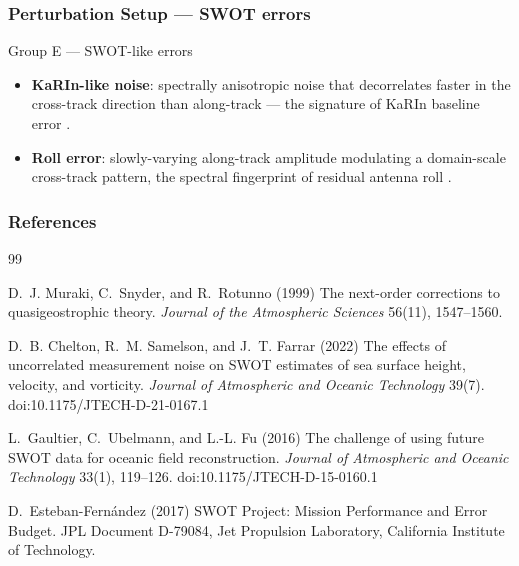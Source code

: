 \documentclass[
	11pt, %
]{beamer}
\begin{document}
\begin{frame}
    \frametitle{Perturbation Setup --- SWOT errors}
    \begin{block}{Group E --- SWOT-like errors}
        \begin{itemize}
            \item \textbf{KaRIn-like noise}: spectrally anisotropic noise that decorrelates faster in the cross-track direction than along-track --- the signature of KaRIn baseline error \cite{chelton2022,gaultier2016}.
            \item \textbf{Roll error}: slowly-varying along-track amplitude modulating a domain-scale cross-track pattern, the spectral fingerprint of residual antenna roll \cite{gaultier2016,esteban-fernandez2017}.
        \end{itemize}
    \end{block}
\end{frame}

\begin{frame}[allowframebreaks]
    \frametitle{References}

    \begin{thebibliography}{99}
        \footnotesize

            D.~J. Muraki, C.~Snyder, and R.~Rotunno (1999)
            \newblock The next-order corrections to quasigeostrophic theory.
            \newblock \emph{Journal of the Atmospheric Sciences} 56(11), 1547--1560.

            D.~B. Chelton, R.~M. Samelson, and J.~T. Farrar (2022)
            \newblock The effects of uncorrelated measurement noise on SWOT estimates of sea surface height, velocity, and vorticity.
            \newblock \emph{Journal of Atmospheric and Oceanic Technology} 39(7).
            \newblock doi:10.1175/JTECH-D-21-0167.1

            L.~Gaultier, C.~Ubelmann, and L.-L. Fu (2016)
            \newblock The challenge of using future SWOT data for oceanic field reconstruction.
            \newblock \emph{Journal of Atmospheric and Oceanic Technology} 33(1), 119--126.
            \newblock doi:10.1175/JTECH-D-15-0160.1

            D.~Esteban-Fern\'andez (2017)
            \newblock SWOT Project: Mission Performance and Error Budget.
            \newblock JPL Document D-79084, Jet Propulsion Laboratory, California Institute of Technology.

    \end{thebibliography}
\end{frame}
\end{document}

